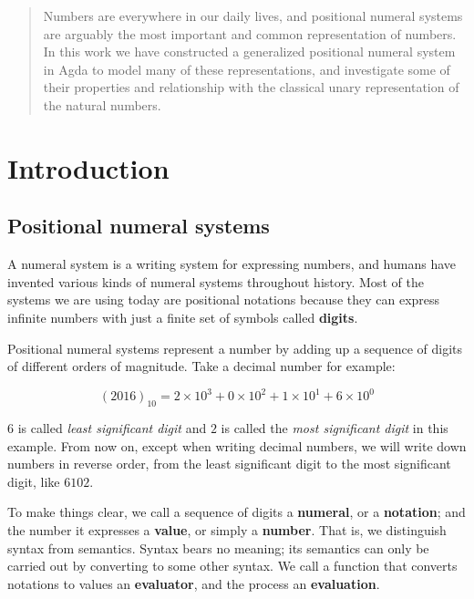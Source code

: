 \documentclass[12pt, a4paper]{article}
\begin{document}
\maketitle

\begin{abstract}
Numbers are everywhere in our daily lives, and positional numeral systems are
arguably the most important and common representation of numbers. In this work
we have constructed a generalized positional numeral system in Agda to model many
of these representations, and investigate some of their properties and relationship
with the classical unary representation of the natural numbers.

\end{abstract}

\section{Introduction}\label{introduction}

\subsection{Positional numeral systems}

A numeral system is a writing system for expressing numbers, and humans have
invented various kinds of numeral systems throughout history. Most of the
systems we are using today are positional notations\cite{knuth1998art} because
they can express infinite numbers with just a finite set of symbols called
\textbf{digits}.

Positional numeral systems represent a number by adding up a sequence of digits
of different orders of magnitude. Take a decimal number for example:

$$ (2016)_{10} = 2\times10^3 + 0\times10^2 + 1\times10^1 + 6\times10^0 $$

$ 6 $ is called \textit{least significant digit} and $ 2 $ is called the
\textit{most significant digit} in this example. From now on, except when writing
decimal numbers, we will write down numbers in reverse order, from the least
significant digit to the most significant digit, like $ 6102 $.

To make things clear, we call a sequence of digits a \textbf{numeral}, or a \textbf{notation};
and the number it expresses a \textbf{value}, or simply a \textbf{number}. That is,
we distinguish syntax from semantics. Syntax bears no meaning; its semantics can
only be carried out by converting to some other syntax. We call a function that
converts notations to values an \textbf{evaluator}, and the process an
\textbf{evaluation}.
\end{document}
